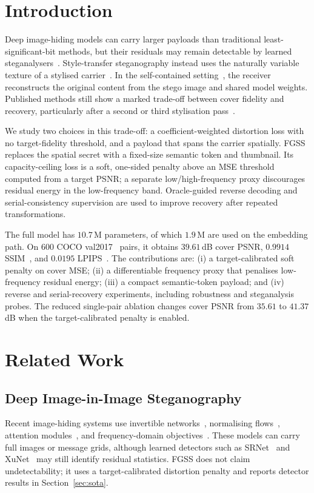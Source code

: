\documentclass[runningheads]{llncs}
\begin{document}
\section{Introduction}

Deep image-hiding models can carry larger payloads than traditional least-significant-bit methods, but their residuals may remain detectable by learned steganalysers~\cite{isn,riis,rmsteg}. Style-transfer steganography instead uses the naturally variable texture of a stylised carrier~\cite{wacv2020,stylestegan2023,sstegogan2024,sst2024,ihst2024,css2024,sddpm2025,stisgan2026}. In the self-contained setting~\cite{wacv2020}, the receiver reconstructs the original content from the stego image and shared model weights. Published methods still show a marked trade-off between cover fidelity and recovery, particularly after a second or third stylisation pass~\cite{wacv2020,stylestegan2023}.

We study two choices in this trade-off: a coefficient-weighted distortion loss with no target-fidelity threshold, and a payload that spans the carrier spatially. FGSS replaces the spatial secret with a fixed-size semantic token and thumbnail. Its capacity-ceiling loss is a soft, one-sided penalty above an MSE threshold computed from a target PSNR; a separate low/high-frequency proxy discourages residual energy in the low-frequency band. Oracle-guided reverse decoding and serial-consistency supervision are used to improve recovery after repeated transformations.

The full model has $10.7$\,M parameters, of which $1.9$\,M are used on the embedding path. On $600$ COCO val2017~\cite{coco} pairs, it obtains $39.61$\,dB cover PSNR, $0.9914$ SSIM~\cite{ssim}, and $0.0195$ LPIPS~\cite{lpips}. The contributions are: (i) a target-calibrated soft penalty on cover MSE; (ii) a differentiable frequency proxy that penalises low-frequency residual energy; (iii) a compact semantic-token payload; and (iv) reverse and serial-recovery experiments, including robustness and steganalysis probes. The reduced single-pair ablation changes cover PSNR from $35.61$ to $41.37$\,dB when the target-calibrated penalty is enabled.

\section{Related Work}
\label{sec:relwork}

\subsection{Deep Image-in-Image Steganography}
Recent image-hiding systems use invertible networks~\cite{isn}, normalising flows~\cite{riis}, attention modules~\cite{rmsteg}, and frequency-domain objectives~\cite{rfs2023}. These models can carry full images or message grids, although learned detectors such as SRNet~\cite{srnet} and XuNet~\cite{xunet} may still identify residual statistics. FGSS does not claim undetectability; it uses a target-calibrated distortion penalty and reports detector results in Section~\ref{sec:sota}.
\end{document}
